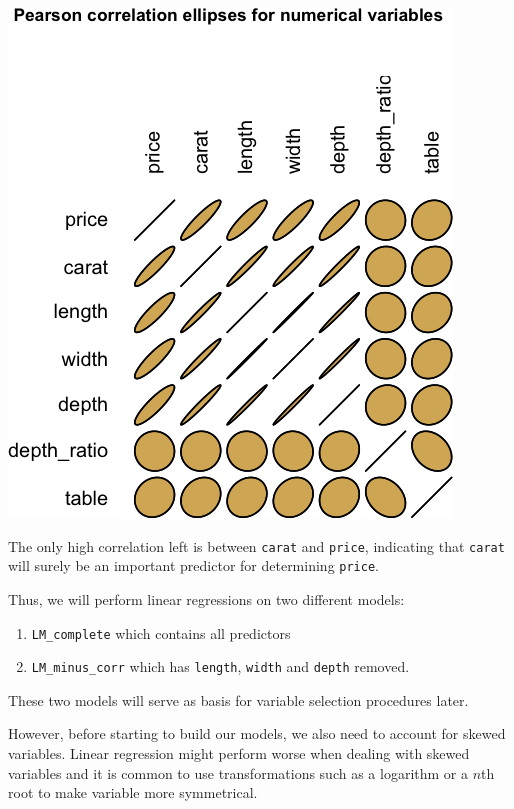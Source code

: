\documentclass[
  paper=a4,
  ,captions=tableheading
]{scrartcl}
\providecommand{\tightlist}{%
  \setlength{\itemsep}{0pt}\setlength{\parskip}{0pt}}
\begin{document}
\begin{center}\includegraphics{Diamonds_PDF_files/figure-latex/uncorrelated-ellipses-1} \end{center}

The only high correlation left is between \texttt{carat} and
\texttt{price}, indicating that \texttt{carat} will surely be an
important predictor for determining \texttt{price}.

Thus, we will perform linear regressions on two different models:

\begin{enumerate}
\def\labelenumi{\arabic{enumi}.}
\tightlist
\item
  \texttt{LM\_complete} which contains all predictors
\item
  \texttt{LM\_minus\_corr} which has \texttt{length}, \texttt{width} and
  \texttt{depth} removed.
\end{enumerate}

These two models will serve as basis for variable selection procedures
later.

However, before starting to build our models, we also need to account
for skewed variables. Linear regression might perform worse when dealing
with skewed variables and it is common to use transformations such as a
logarithm or a \(n\)th root to make variable more symmetrical.
\end{document}
